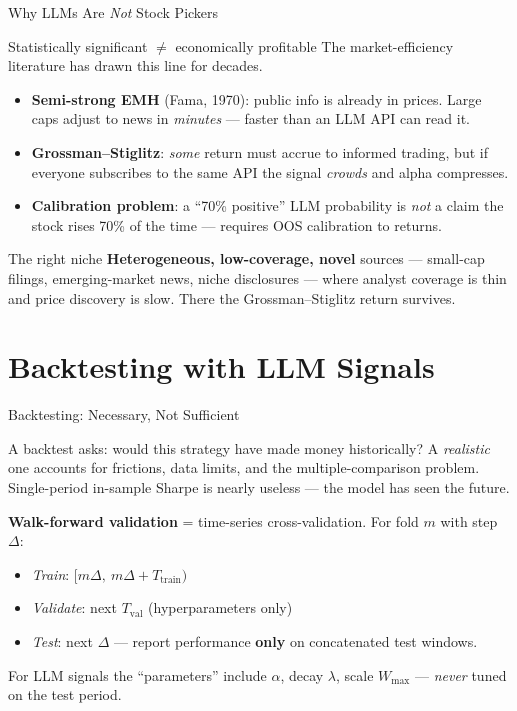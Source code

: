 \documentclass[9pt,t]{beamer}
\begin{document}
\begin{frame}{Why LLMs Are \emph{Not} Stock Pickers}
\begin{alertblock}{Statistically significant $\ne$ economically profitable}
The market-efficiency literature has drawn this line for decades.
\end{alertblock}

\begin{itemize}
  \item \textbf{Semi-strong EMH} (Fama, 1970): public info is already in prices.
        Large caps adjust to news in \emph{minutes} --- faster than an LLM API can read it.
  \item \textbf{Grossman--Stiglitz}: \emph{some} return must accrue to informed trading,
        but if everyone subscribes to the same API the signal \emph{crowds} and alpha compresses.
  \item \textbf{Calibration problem}: a ``70\% positive'' LLM probability is \emph{not}
        a claim the stock rises 70\% of the time --- requires OOS calibration to returns.
\end{itemize}

\medskip
\begin{block}{The right niche}
\textbf{Heterogeneous, low-coverage, novel} sources --- small-cap filings,
emerging-market news, niche disclosures --- where analyst coverage is thin and
price discovery is slow. There the Grossman--Stiglitz return survives.
\end{block}
\end{frame}

\section{Backtesting with LLM Signals}

\begin{frame}{Backtesting: Necessary, Not Sufficient}
\begin{bigpicture}
A backtest asks: would this strategy have made money historically? A \emph{realistic}
one accounts for frictions, data limits, and the multiple-comparison problem.
Single-period in-sample Sharpe is nearly useless --- the model has seen the future.
\end{bigpicture}

\medskip
\textbf{Walk-forward validation} = time-series cross-validation. For fold $m$ with step $\Delta$:
\begin{itemize}
  \item \emph{Train}: $[m\Delta,\ m\Delta+T_{\text{train}})$
  \item \emph{Validate}: next $T_{\text{val}}$ (hyperparameters only)
  \item \emph{Test}: next $\Delta$ --- report performance \textbf{only} on concatenated test windows.
\end{itemize}
For LLM signals the ``parameters'' include $\alpha$, decay $\lambda$, scale $W_{\max}$ ---
\emph{never} tuned on the test period.
\end{frame}
\end{document}
